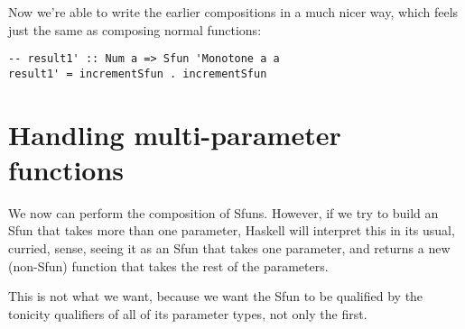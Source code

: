 \documentclass[11pt]{article}
\begin{document}
Now we're able to write the earlier compositions in a much nicer way, which feels just the same as composing normal functions:

\begin{verbatim}
-- result1' :: Num a => Sfun 'Monotone a a
result1' = incrementSfun . incrementSfun
\end{verbatim}

\section{Handling multi-parameter functions}
\label{sec:org838430e}
We now can perform the composition of Sfuns. However, if we try to build an Sfun that takes more than one parameter,
Haskell will interpret this in its usual, curried, sense, seeing it as an Sfun that takes one parameter,
and returns a new (non-Sfun) function that takes the rest of the parameters.

This is not what we want, because we want the Sfun to be qualified by the tonicity qualifiers of all of its parameter types,
not only the first.
\end{document}
